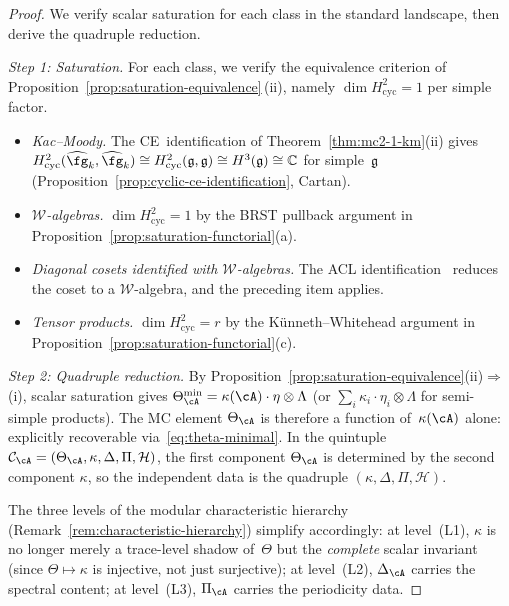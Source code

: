 \begin{proof}
We verify scalar saturation for each class in the standard
landscape, then derive the quadruple reduction.

\emph{Step 1: Saturation.}
For each class, we verify the equivalence
criterion of Proposition~\ref{prop:saturation-equivalence}\,(ii),
namely $\dim H^2_{\mathrm{cyc}} = 1$ per simple factor.
\begin{itemize}
\item \emph{Kac--Moody.}
  The CE~identification of
  Theorem~\ref{thm:mc2-1-km}(ii) gives
  $H^2_{\mathrm{cyc}}(\widehat{\fg}_k, \widehat{\fg}_k)
  \cong H^2_{\mathrm{cyc}}(\mathfrak{g},\mathfrak{g})
  \cong H^3(\mathfrak{g}) \cong \mathbb{C}$ for
  simple~$\mathfrak{g}$
  (Proposition~\ref{prop:cyclic-ce-identification},
  Cartan).
\item \emph{$\mathcal{W}$-algebras.}
  $\dim H^2_{\mathrm{cyc}} = 1$ by the BRST pullback
  argument in
  Proposition~\ref{prop:saturation-functorial}(a).
\item \emph{Diagonal cosets identified with
  $\mathcal{W}$-algebras.}
  The ACL identification~\cite{ACL19} reduces the coset to a
  $\mathcal{W}$-algebra, and the preceding item applies.
\item \emph{Tensor products.}
  $\dim H^2_{\mathrm{cyc}} = r$ by the K\"unneth--Whitehead
  argument in
  Proposition~\ref{prop:saturation-functorial}(c).
\end{itemize}

\emph{Step 2: Quadruple reduction.}
By Proposition~\ref{prop:saturation-equivalence}(ii)$\Rightarrow$(i),
scalar saturation gives
$\Theta^{\min}_{\cA} = \kappa(\cA) \cdot \eta \otimes \Lambda$
(or $\sum_i \kappa_i \cdot \eta_i \otimes \Lambda$ for
semi-simple products).  The MC element $\Theta_{\cA}$
is therefore a function of~$\kappa(\cA)$ alone: explicitly
recoverable via~\eqref{eq:theta-minimal}.
In the quintuple
$\mathcal{C}_{\cA} = (\Theta_{\cA}, \kappa, \Delta, \Pi,
\mathcal{H})$, the first component $\Theta_{\cA}$ is
determined by the second component $\kappa$, so the
independent data is the quadruple
$(\kappa, \Delta, \Pi, \mathcal{H})$.

The three levels of the modular characteristic hierarchy
(Remark~\ref{rem:characteristic-hierarchy}) simplify
accordingly:
at level~(L1), $\kappa$ is no longer merely a trace-level
shadow of~$\Theta$ but the \emph{complete}
scalar invariant (since
$\Theta \mapsto \kappa$ is injective, not just surjective);
at level~(L2), $\Delta_{\cA}$ carries the spectral content;
at level~(L3), $\Pi_{\cA}$ carries the periodicity data.
\end{proof}

